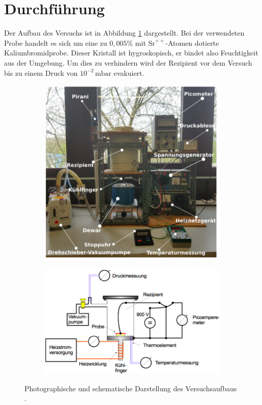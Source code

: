 \section{Durchführung}
\label{sec:Durchführung}
Der Aufbau des Versuchs ist in Abbildung \ref{fig:tfig3} dargestellt. 
Bei der verwendeten Probe handelt es sich um eine zu $0,005\%$ mit $\text{Sr}^{++}$-Atomen dotierte Kaliumbromidprobe.
Dieser Kristall ist hygroskopisch, er bindet also Feuchtigkeit aus der Umgebung.
Um dies zu verhindern wird der Rezipient vor dem Versuch bis zu einem Druck von $10^{-2}\,\text{mbar}$ evakuiert.

\begin{figure}[H]
    \begin{subfigure}{0.40\textwidth}
    \centering
    \includegraphics[width=\linewidth]{figs/aufbau}
    \end{subfigure}
    \begin{subfigure}{0.58\textwidth}
    \centering
    \includegraphics[width=1.1\linewidth]{figs/aufbau2}
    \end{subfigure}
    \caption{Photographische und schematische Darstellung des Versuchsaufbaus \cite{skript}.}
    \label{fig:tfig3}
\end{figure}

